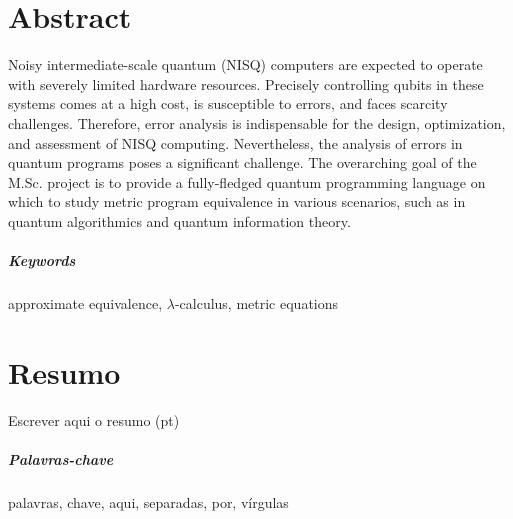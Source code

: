 \chapter*{Abstract}

Noisy intermediate-scale quantum (NISQ)  computers are expected to operate with severely limited hardware resources. Precisely controlling qubits in these systems comes at a high cost, is susceptible to errors, and faces scarcity challenges. Therefore, error analysis is indispensable for the design, optimization, and assessment of NISQ computing. Nevertheless, the analysis of errors in quantum programs poses a significant challenge. The overarching goal of the M.Sc. project is to provide a fully-fledged
quantum programming language on which to study metric program equivalence
in various scenarios, such as in quantum algorithmics and quantum information theory.


\paragraph{Keywords} approximate equivalence, $\lambda$-calculus, metric equations

\cleardoublepage

\chapter*{Resumo}

Escrever aqui o resumo (pt)

\paragraph{Palavras-chave} palavras, chave, aqui, separadas, por, vírgulas

\cleardoublepage
